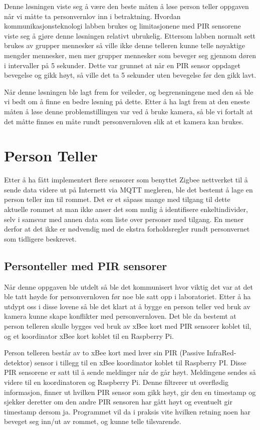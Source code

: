 \documentclass{article}
\begin{document}
Denne løsningen viste seg å være den beste måten å løse person teller oppgaven når vi måtte ta personvernlov inn i betraktning. Hvordan kommunikasjonsteknologi labben brukes og limitasjonene med PIR sensorene viste seg å gjøre denne løsningen relativt ubrukelig. Ettersom labben normalt sett brukes av grupper mennesker så ville ikke denne telleren kunne telle nøyaktige mengder mennesker, men mer grupper mennesker som beveger seg gjennom døren i intervaller på 5 sekunder. Dette var grunnet at når en PIR sensor oppdaget bevegelse og gikk høyt, så ville det ta 5 sekunder uten bevegelse før den gikk lavt. 

Når denne løsningen ble lagt frem for veileder, og begrensningene med den så ble vi bedt om å finne en bedre løsning på dette. Etter å ha lagt frem at den eneste måten å løse denne problemstillingen var ved å bruke kamera, så ble vi fortalt at det måtte finnes en måte rundt personvernloven slik at et kamera kan brukes.

\newpage 
\section{Person Teller}
Etter å ha fått implementert flere sensorer som benyttet Zigbee nettverket til å sende data videre ut på Internett via MQTT megleren, ble det bestemt å lage en person teller inn til rommet. Det er et såpass mange med tilgang til dette aktuelle rommet at man ikke anser det som mulig å identifisere enkeltindivider, selv i samsvar med annen data som liste over personer med tilgang. En mener derfor at det ikke er nødvendig med de ekstra forholdsregler rundt personvernet som tidligere beskrevet.

\subsection{Personteller med PIR sensorer}
Når denne oppgaven ble utdelt så ble det kommunisert hvor viktig det var at det ble tatt høyde for personvernloven før noe ble satt opp i laboratoriet. Etter å ha utdypt oss i disse lovene så ble det klart at å bygge en person teller ved bruk av kamera kunne skape konflikter med personvernloven. Det ble da bestemt at person telleren skulle bygges ved bruk av xBee kort med PIR sensorer koblet til, og et koordinator xBee kort koblet til en Raspberry Pi.

Person telleren består av to xBee kort med hver sin PIR (Passive InfraRed-detektor) sensor i tillegg til en xBee koordinator koblet til Raspberry PI. Disse PIR sensorene er satt til å sende meldinger når de går høyt. Meldingene  sendes så videre til en koordinatoren og Raspberry Pi. Denne filtrerer ut overflødig informasjon, finner ut hvilken PIR sensor som gikk høyt, gir den en timestamp og sjekker deretter om den andre PIR sensoren har gått høyt og eventuelt gir timestamp dersom ja. Programmet vil da i praksis vite hvilken retning noen har beveget seg inn/ut av rommet, og kunne telle tilsvarende.
\end{document}
